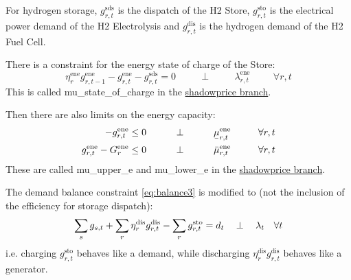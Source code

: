 \documentclass[final,3p,times]{elsarticle}
\newcommand{\ubar}[1]{\text{\b{$#1$}}}
\def\l{\lambda}
\begin{document}
For hydrogen storage, $g^{\textrm{sds}}_{r,t}$ is the dispatch of the H2 Store, $g^{\textrm{sto}}_{r,t}$ is the electrical power demand of the H2 Electrolysis and $g^{\textrm{dis}}_{r,t}$ is the hydrogen demand of the H2 Fuel Cell.

There is a constraint for the energy state of charge of the Store:
\begin{equation}
  \eta^{\textrm{ene}}_r g^{\textrm{ene}}_{r,t-1} - g^{\textrm{ene}}_{r,t} - g^{\textrm{sds}}_{r,t} = 0  \hspace{1cm}\perp \hspace{1cm} \lambda^{\textrm{ene}}_{r,t} \hspace{1cm} \forall r,t  \label{eq:soc3}
\end{equation}
This is called mu\_state\_of\_charge in the \href{https://github.com/PyPSA/PyPSA/blob/shadowprices/pypsa/linopf.py}{shadowprice branch}.

Then there are also limits on the energy capacity:
\begin{align}
    -g^{\textrm{ene}}_{r,t}\leq 0 \hspace{1cm}\perp \hspace{1cm} \ubar{\mu}^{\textrm{ene}}_{r,t} \hspace{1cm} \forall r,t  \label{eq:storlower3}\\
    g^{\textrm{ene}}_{r,t} - G^{\textrm{ene}}_r \leq 0 \hspace{1cm}\perp \hspace{1cm} \bar{\mu}^{\textrm{ene}}_{r,t} \hspace{1cm} \forall r,t \label{eq:storupper3}
\end{align}
These are called mu\_upper\_e and mu\_lower\_e in the \href{https://github.com/PyPSA/PyPSA/blob/shadowprices/pypsa/linopf.py}{shadowprice branch}.


The demand balance constraint \eqref{eq:balance3} is modified to (not the inclusion of the efficiency for storage dispatch):
\begin{align}
   \sum_s g_{s,t} + \sum_r \eta^{\textrm{dis}}_r g^{\textrm{dis}}_{r,t} - \sum_r g^{\textrm{sto}}_{r,t}  =  d_t \hspace{0.34cm}\perp \hspace{0.34cm} \l_t \hspace{0.34cm} \forall t \label{eq:balance4}
\end{align}
i.e. charging $g^{\textrm{sto}}_{r,t}$ behaves like a demand, while discharging $\eta^{\textrm{dis}}_rg^{\textrm{dis}}_{r,t}$ behaves like a generator.
\end{document}
